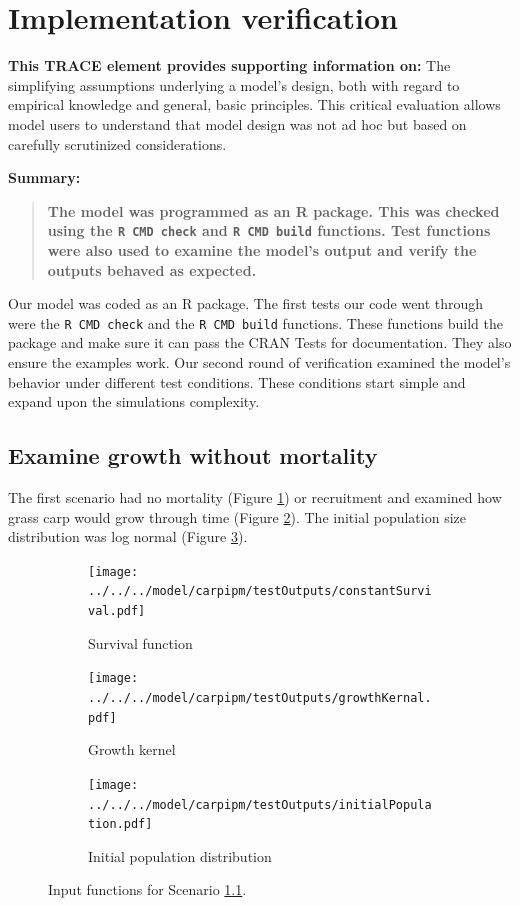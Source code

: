 \documentclass{article}[12pt]
\begin{document}
\section{Implementation verification}\label{sec:IpVer}
\textbf{This TRACE element provides supporting information on:} The simplifying assumptions underlying a model's design, both with regard to empirical knowledge and general, basic principles. This critical evaluation allows model users to understand that model design was not ad hoc but based on carefully scrutinized considerations. 

\textbf{Summary:}
\begin{verse}
\textbf{
The model was programmed as an R package.
This was checked using the \texttt{R CMD check} and \texttt{R CMD build} functions. 
Test functions were also used to  examine the model's output and verify the outputs behaved as expected.
}
\end{verse}

Our model was coded as an R package.
The first tests our code went through were the \texttt{R CMD check} and the \texttt{R CMD build} functions.
These functions build the package and make sure it can pass the CRAN Tests for documentation.
They also ensure the examples work.
Our second round of verification examined the model's behavior under different test conditions.
These conditions start simple and expand upon the simulations complexity. 


\subsection{Examine growth without mortality}\label{egwm}

The first scenario had no mortality (Figure \ref{fig:suv1}) or recruitment and examined how grass carp would grow through time (Figure \ref{fig:grow1}).
The initial population size distribution was log normal (Figure \ref{fig:ip1}).

\begin{figure}[htbp]
	\centering
	\begin{subfigure}[b]{0.2\textwidth}
		\texttt{[image: ../../../model/carpipm/testOutputs/constantSurvival.pdf]} 
		\caption{Survival function} 
		\label{fig:suv1}
	\end{subfigure}
	\qquad
	\begin{subfigure}[b]{0.3\textwidth}
		\texttt{[image: ../../../model/carpipm/testOutputs/growthKernal.pdf]} 
		\caption{Growth kernel} 
		\label{fig:grow1}
	\end{subfigure}
	\qquad
	\begin{subfigure}[b]{0.2\textwidth}
		\texttt{[image: ../../../model/carpipm/testOutputs/initialPopulation.pdf]} 
		\caption{Initial population distribution} 
		\label{fig:ip1}
	\end{subfigure}
   \caption{Input functions for Scenario \ref{egwm}.}
   \label{fig:scn1}
\end{figure}
\end{document}
